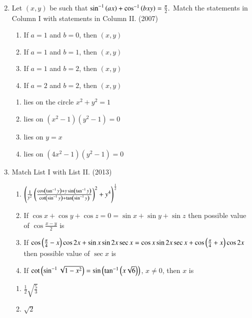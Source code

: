 \begin{enumerate}[label=\thesubsection.\arabic*,ref=\thesubsection.\theenumi]
{\begin{multicols}{2}
\begin{enumerate}
			\end{enumerate}
		\end{multicols}}
	\item{
		Let $(x,y)$ be such that $\sin^{-1}\left(ax\right)+\cos^{-1}\left(bxy\right)=\frac{\pi}{2}.$
		Match the statements in Column I with statements in Column II.  \hfill (2007)
		\begin{multicols}{2}
			\begin{enumerate}
				\item{If $a=1$ and $b=0$, then $(x, y)$}
				\item{If $a=1$ and $b=1$, then $(x, y)$}
				\item{If $a=1$ and $b=2$, then $(x, y)$}
				\item{If $a=2$ and $b=2$, then $(x, y)$}
			\end{enumerate}
			\columnbreak
			\begin{enumerate}
				\item{lies on the circle $x^2 + y^2 = 1$}
				\item{lies on $(x^2-1)(y^2-1)=0$}
				\item{lies on $y=x$}
				\item{lies on $(4x^2-1)(y^2-1)=0$}
			\end{enumerate}
		\end{multicols}}
%	
%    
	\item{	
		Match List I with List II.  \hfill (2013)
		\begin{multicols}{2}
			\begin{enumerate}
				\item{\footnotesize $\left(\frac{1}{y^2}\left(\frac{\cos\left(\tan^{-1}y\right)+y\sin\left(\tan^{-1}y\right)}{\cot\left(\sin^{-1}y\right)+\tan\left(\sin^{-1}y\right)}\right)^2 + y^4\right)^\frac{1}{2}$} 
				\item{\footnotesize If $\cos x+\cos y+\cos z = 0 = \sin x+\sin y+\sin z$ then possible value of $\cos\frac{x-y}{2}$ is}
				\item{\footnotesize If $\cos\left(\frac{\pi}{4}-x\right) \cos 2x+\sin x\sin 2x\sec x=\cos x\sin 2x\sec x+\cos\left(\frac{\pi}{4}+x\right)\cos 2x$ then possible value of $\sec x$ is}
				\item{\footnotesize If $\cot\left(\sin^{-1}\sqrt{1-x^2}\right)=\sin\left(\tan^{-1}\left(x\sqrt{6}\right)\right)$, $x\neq 0$, then $x$ is}
			\end{enumerate}
			\columnbreak
			\begin{enumerate}
				\item{$\frac{1}{2}\sqrt{\frac{5}{3}}$}
				\item{$\sqrt{2}$}

\end{enumerate}
\end{multicols}}
\end{enumerate}
